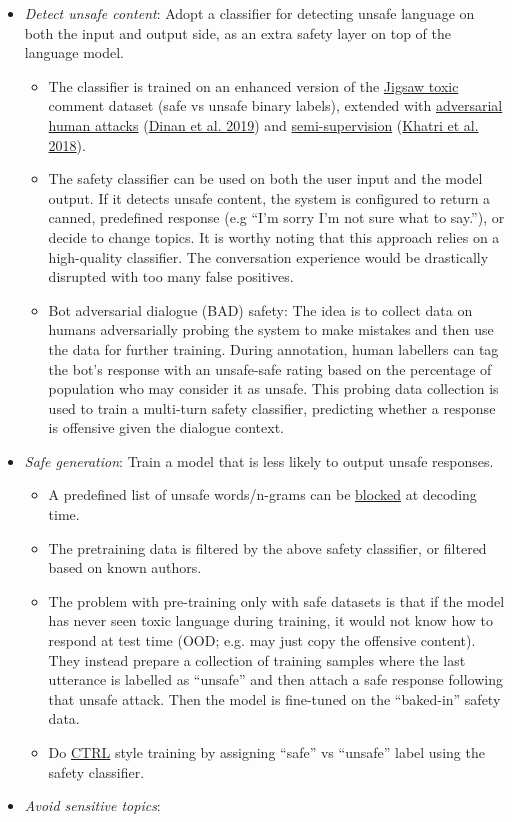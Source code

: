 \begin{itemize}
\tightlist
\item
  \emph{Detect unsafe content}: Adopt a classifier for detecting unsafe language on both the input and output side, as an extra safety layer on top of the language model.

  \begin{itemize}
  \tightlist
  \item
    The classifier is trained on an enhanced version of the \hyperref[jigsaw]{Jigsaw toxic} comment dataset (safe vs unsafe binary labels), extended with \hyperref[adversarial-attacks]{adversarial human attacks} (\href{https://arxiv.org/abs/1908.06083}{Dinan et al. 2019}) and \hyperref[semi-supervised-dataset]{semi-supervision} (\href{https://arxiv.org/abs/1811.12900}{Khatri et al. 2018}).
  \item
    The safety classifier can be used on both the user input and the model output. If it detects unsafe content, the system is configured to return a canned, predefined response (e.g ``I'm sorry I'm not sure what to say.''), or decide to change topics. It is worthy noting that this approach relies on a high-quality classifier. The conversation experience would be drastically disrupted with too many false positives.
  \item
    Bot adversarial dialogue (BAD) safety: The idea is to collect data on humans adversarially probing the system to make mistakes and then use the data for further training. During annotation, human labellers can tag the bot's response with an unsafe-safe rating based on the percentage of population who may consider it as unsafe. This probing data collection is used to train a multi-turn safety classifier, predicting whether a response is offensive given the dialogue context.
  \end{itemize}
\item
  \emph{Safe generation}: Train a model that is less likely to output unsafe responses.

  \begin{itemize}
  \tightlist
  \item
    A predefined list of unsafe words/n-grams can be \hyperref[blacklisting]{blocked} at decoding time.
  \item
    The pretraining data is filtered by the above safety classifier, or filtered based on known authors.
  \item
    The problem with pre-training only with safe datasets is that if the model has never seen toxic language during training, it would not know how to respond at test time (OOD; e.g. may just copy the offensive content). They instead prepare a collection of training samples where the last utterance is labelled as ``unsafe'' and then attach a safe response following that unsafe attack. Then the model is fine-tuned on the ``baked-in'' safety data.
  \item
    Do \href{https://arxiv.org/abs/1909.05858}{CTRL} style training by assigning ``safe'' vs ``unsafe'' label using the safety classifier.
  \end{itemize}
\item
  \emph{Avoid sensitive topics}:


\end{itemize}
